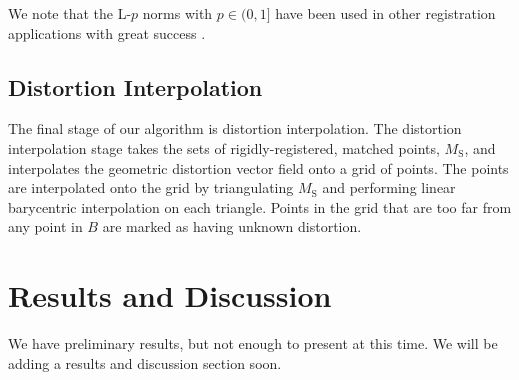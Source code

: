 \documentclass[12pt]{article}
\begin{document}
We note that the L-$p$ norms with $p \in (0, 1]$ have been used in other registration applications with great success \cite{bouaziz2013}.  

\subsection{Distortion Interpolation}

The final stage of our algorithm is distortion interpolation.  The distortion interpolation stage takes the sets of rigidly-registered, matched points, $M_\textrm{S}$, and interpolates the geometric distortion vector field onto a grid of points. The points are interpolated onto the grid by triangulating $M_\textrm{S}$ and performing linear barycentric interpolation on each triangle. Points in the grid that are too far from any point in $B$ are marked as having unknown distortion.

\section{Results and Discussion}

We have preliminary results, but not enough to present at this time.  We will be adding a results and discussion section soon.



\end{document}
